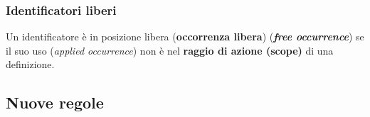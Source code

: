 \documentclass[a4paper]{article}
\begin{document}
	
	\subsubsection{Identificatori liberi}
	
	\begin{boxdef}
		Un identificatore è in posizione libera (\textcolor{Red3}{\textbf{occorrenza libera}}) (\textbf{\emph{free occurrence}}) se il suo uso (\emph{applied occurrence}) non è nel \textbf{raggio di azione (scope)} di una definizione.
	\end{boxdef}\newpage
	
	
	\subsection{Nuove regole}\label{nuove regole}
	
\end{document}
